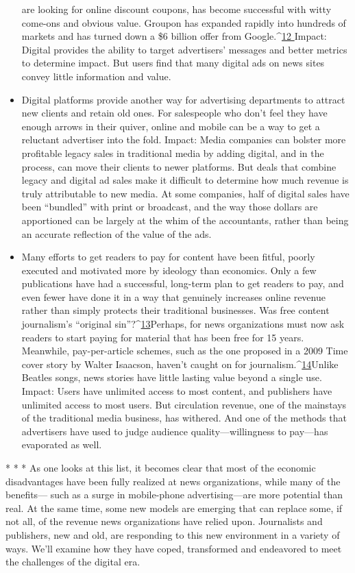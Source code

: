 \begin{itemize}
are looking for online discount coupons, has become successful with witty
come-ons and obvious value. Groupon has expanded rapidly into hundreds
of markets and has turned down a \$6 billion offer from Google.^{\href{#endnotes-chapter-1}{12
}}Impact: Digital provides the ability to target advertisers' messages and better
metrics to determine impact. But users find that many digital ads on news
sites convey little information and value.
\item Digital platforms provide another way for advertising departments to
attract new clients and retain old ones. For salespeople who don't feel
they have enough arrows in their quiver, online and mobile can be a way to
get a reluctant advertiser into the fold.
Impact: Media companies can bolster more profitable legacy sales in traditional
media by adding digital, and in the process, can move their clients to
newer platforms. But deals that combine legacy and digital ad sales make it
difficult to determine how much revenue is truly attributable to new media.
At some companies, half of digital sales have been ``bundled'' with print or
broadcast, and the way those dollars are apportioned can be largely at the
whim of the accountants, rather than being an accurate reflection of the
value of the ads.
\item Many efforts to get readers to pay for content have been fitful, poorly
executed and motivated more by ideology than economics. Only a few
publications have had a successful, long-term plan to get readers to pay, and
even fewer have done it in a way that genuinely increases online revenue
rather than simply protects their traditional businesses. Was free content journalism's
``original sin''?^{\href{#endnotes-chapter-1}{13}}Perhaps, for news organizations must now ask readers
to start paying for material that has been free for 15 years. Meanwhile,
pay-per-article schemes, such as the one proposed in a 2009 Time cover
story by Walter Isaacson, haven't caught on for journalism.^{\href{#endnotes-chapter-1}{14}}Unlike Beatles
songs, news stories have little lasting value beyond a single use.
Impact: Users have unlimited access to most content, and publishers have
unlimited access to most users. But circulation revenue, one of the mainstays
of the traditional media business, has withered. And one of the methods that
advertisers have used to judge audience quality—willingness to pay—has
evaporated as well.
\end{itemize}
* * *
As one looks at this list, it becomes clear that most of the economic disadvantages
have been fully realized at news organizations, while many of the benefits—
such as a surge in mobile-phone advertising—are more potential than real. At the
same time, some new models are emerging that can replace some, if not all, of the
revenue news organizations have relied upon. Journalists and publishers, new and
old, are responding to this new environment in a variety of ways. We'll examine
how they have coped, transformed and endeavored to meet the challenges of the
digital era.

